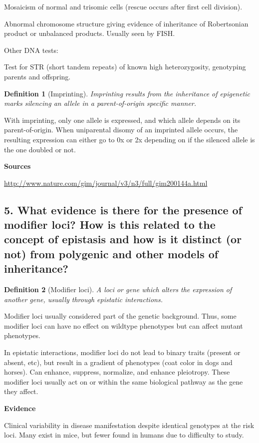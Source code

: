 \documentclass{tufte-handout}
\theoremstyle{noparens}
\newtheorem*{define}{Definition}
\begin{document}
 Mosaicism of normal and trisomic cells (rescue occurs after first cell division).
 
 Abnormal chromosome structure giving evidence of inheritance of Robertsonian product or unbalanced products. Usually seen by FISH.
 
 Other DNA tests:
 
 Test for STR (short tandem repeats) of known high heterozygosity, genotyping parents and offspring. 

\begin{define}[Imprinting]
Imprinting results from the inheritance of epigenetic marks silencing an allele in a parent-of-origin specific manner.
\end{define}

With imprinting, only one allele is expressed, and which allele depends on its parent-of-origin. When uniparental disomy of an imprinted allele occurs, the resulting expression can either go to 0x or 2x depending on if the silenced allele is the one doubled or not.

 \textbf{Sources}
 
 \url{http://www.nature.com/gim/journal/v3/n3/full/gim200144a.html}
 
\newpage
\subsection{5.
What evidence is there for the presence of modifier loci? How is this related to the concept of epistasis and how is it distinct (or not) from polygenic and other models of inheritance?}
\label{subsec:05}

\begin{define}[Modifier loci]
A loci or gene which alters the expression of another gene, usually through epistatic interactions.
\end{define}

Modifier loci usually considered part of the genetic background. Thus, some modifier loci can have no effect on wildtype phenotypes but can affect mutant phenotypes.

In epistatic interactions, modifier loci do not lead to binary traits (present or absent, etc), but result in a gradient of phenotypes (coat color in dogs and horses). Can enhance, suppress, normalize, and enhance pleiotropy. These modifier loci usually act on or within the same biological pathway as the gene they affect.

\noindent
\textbf{Evidence}

Clinical variability in disease manifestation despite identical genotypes at the risk loci. Many exist in mice, but fewer found in humans due to difficulty to study.
\end{document}
